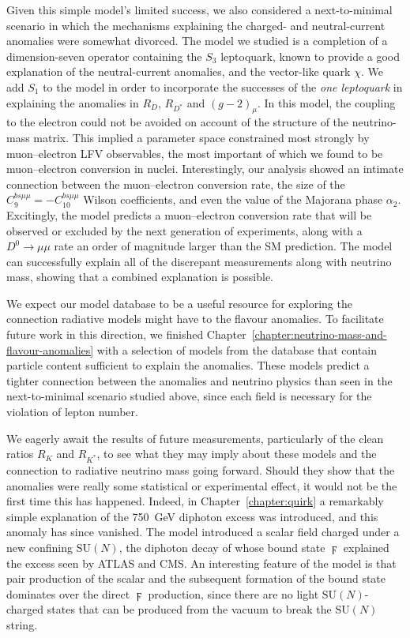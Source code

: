 Given this simple model's limited success, we also considered a next-to-minimal
scenario in which the mechanisms explaining the charged- and neutral-current
anomalies were somewhat divorced. The model we studied is a completion of a
dimension-seven operator containing the $S_{3}$ leptoquark, known to provide
a good explanation of the neutral-current anomalies, and the vector-like quark
$\chi$. We add $S_{1}$ to the model in order to incorporate the successes of the
\textit{one leptoquark} in explaining the anomalies in $R_{D}$, $R_{D^{*}}$ and
$(g-2)_{\mu}$. In this model, the coupling to the electron could not be avoided
on account of the structure of the neutrino-mass matrix. This implied a
parameter space constrained most strongly by muon--electron LFV observables, the
most important of which we found to be muon--electron conversion in nuclei.
Interestingly, our analysis showed an intimate connection between the
muon--electron conversion rate, the size of the
$C_{9}^{bs\mu\mu} = - C_{10}^{bs\mu\mu}$ Wilson coefficients, and even the value
of the Majorana phase $\alpha_{2}$. Excitingly, the model predicts a
muon--electron conversion rate that will be observed or excluded by the next
generation of experiments, along with a $D^{0} \to \mu\mu$ rate an order of
magnitude larger than the SM prediction. The model can successfully explain all
of the discrepant measurements along with neutrino mass, showing that a combined
explanation is possible.

We expect our model database to be a useful resource for exploring the
connection radiative models might have to the flavour anomalies. To facilitate
future work in this direction, we finished
Chapter~\ref{chapter:neutrino-mass-and-flavour-anomalies} with a selection of
models from the database that contain particle content sufficient to explain the
anomalies. These models predict a tighter connection between the anomalies and
neutrino physics than seen in the next-to-minimal scenario studied above, since
each field is necessary for the violation of lepton number.

We eagerly await the results of future measurements, particularly of the clean
ratios $R_{K}$ and $R_{K^{*}}$, to see what they may imply about these models
and the connection to radiative neutrino mass going forward. Should they show
that the anomalies were really some statistical or experimental effect, it would
not be the first time this has happened. Indeed, in Chapter~\ref{chapter:quirk}
a remarkably simple explanation of the \SI{750}{\GeV} diphoton excess was
introduced, and this anomaly has since vanished. The model introduced a scalar
field charged under a new confining $\mathrm{SU}(N)$, the diphoton decay of
whose bound state $\digamma$ explained the excess seen by ATLAS and CMS. An
interesting feature of the model is that pair production of the scalar and the
subsequent formation of the bound state dominates over the direct $\digamma$
production, since there are no light $\mathrm{SU}(N)$-charged states that can be
produced from the vacuum to break the $\mathrm{SU}(N)$ string.

